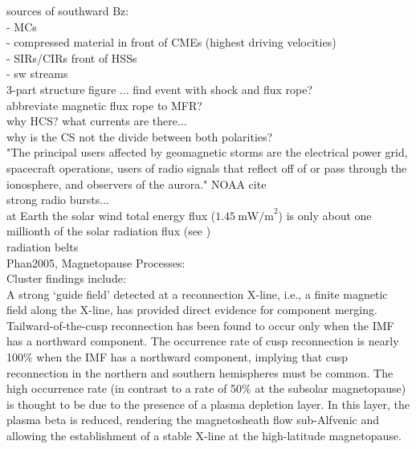 

sources of southward Bz:\\
- MCs\\
- compressed material in front of CMEs (highest driving velocities)\\
- SIRs/CIRs front of HSSs\\
- sw streams\\


3-part structure figure ... find event with shock and flux rope?\\
abbreviate magnetic flux rope to MFR?\\
 
why HCS? what currents are there...\\
why is the CS not the divide between both polarities?\\

"The principal users affected by geomagnetic storms are the electrical power grid, spacecraft operations, users of radio signals that reflect off of or pass through the ionosphere, and observers of the aurora." NOAA cite\\

strong radio bursts...\\

at Earth the solar wind total energy flux ($1.45~\text{mW/m}^2$) is only about one millionth of the solar radiation flux (see \citet[p.~153]{Schwenn1990})\\

radiation belts\\

Phan2005, Magnetopause Processes:\\
Cluster findings include:\\
A strong ‘guide field’ detected at a reconnection X-line, i.e., a finite magnetic field along the X-line, has provided direct evidence for component merging.\\
Tailward-of-the-cusp reconnection has been found to occur only when the IMF has a northward component. The occurrence rate of cusp reconnection is nearly 100\% when the IMF has a northward component, implying that cusp reconnection in the northern and southern hemispheres must be common. The high occurrence rate (in contrast to a rate of 50\% at the subsolar magnetopause) is thought to be due to the presence of a plasma depletion layer. In this layer, the plasma beta is reduced, rendering the magnetosheath flow sub-Alfvenic and allowing the establishment of a stable X-line at the high-latitude magnetopause.\\

